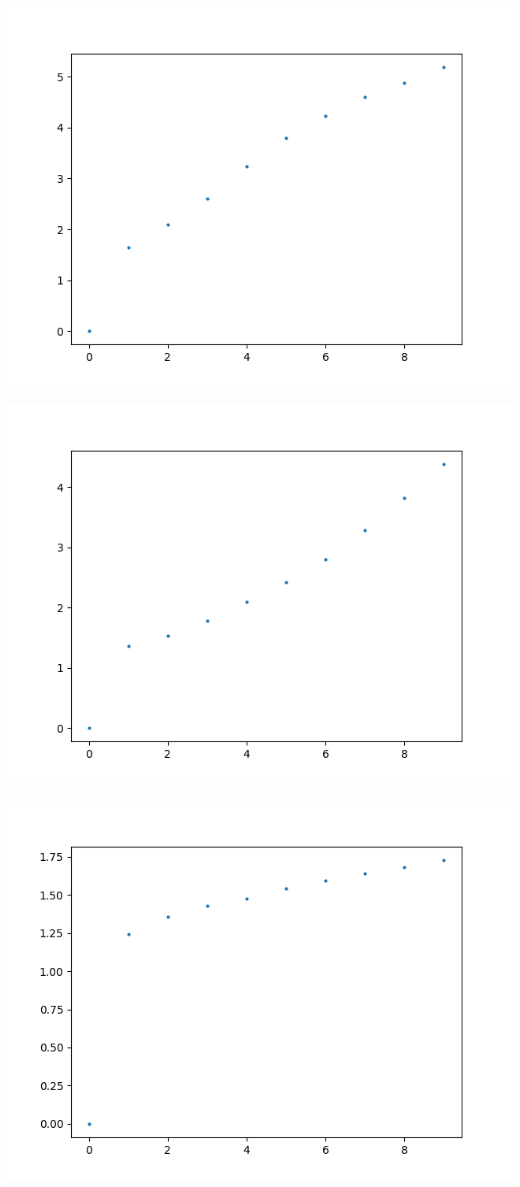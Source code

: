 \documentclass[11pt]{article}
\begin{document}
\begin{multicols}{2}
\includegraphics[scale=0.5]{part2.1/8x8.png}

\includegraphics[scale=0.5]{part2.1/12x12.png}

\includegraphics[scale=0.5]{part2.1/24x24.png}


\end{multicols}
\end{document}

